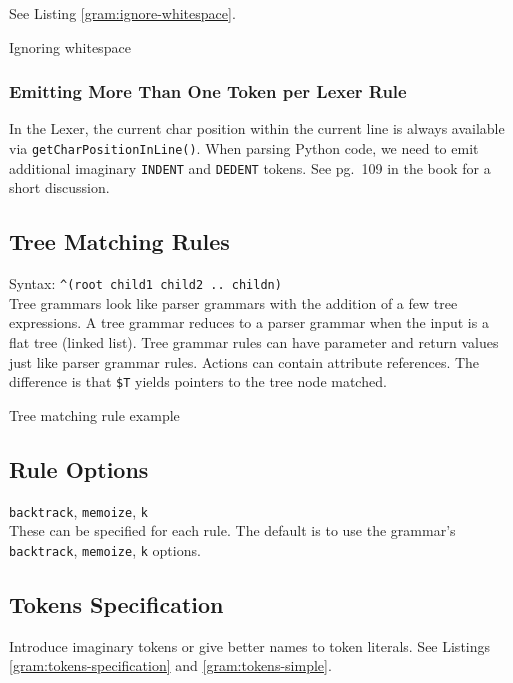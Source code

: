 See Listing \ref{gram:ignore-whitespace}.

\begin{program}
\caption{Ignoring whitespace\label{gram:ignore-whitespace}}
\end{program}

\subsubsection{Emitting More Than One Token per Lexer Rule}
In the Lexer, the current char position within the current line
is always available via \verb=getCharPositionInLine()=.
When parsing Python code,
we need to emit additional imaginary \verb=INDENT= and \verb=DEDENT= tokens.
See pg.\ 109 in the book for a short discussion.


\subsection{Tree Matching Rules}

Syntax: \verb_^(root child1 child2 .. childn)_\\
Tree grammars look like parser grammars
with the addition of a few tree expressions.
A tree grammar reduces to a parser grammar when the input is a flat tree
(linked list).
Tree grammar rules can have parameter and return values
just like parser grammar rules.
Actions can contain attribute references.
The difference is that \verb=$T= yields pointers to the tree node matched.

\begin{program}
\caption{Tree matching rule example\label{gram:tree-rule-simple}}
\end{program}


\subsection{Rule Options}

\verb=backtrack=, \verb=memoize=, \verb=k=\\
These can be specified for each rule.
The default is to use the grammar's
\verb=backtrack=, \verb=memoize=, \verb=k= options.


\subsection{Tokens Specification}

Introduce imaginary tokens or give better names to token literals.
See Listings \ref{gram:tokens-specification} and \ref{gram:tokens-simple}.

